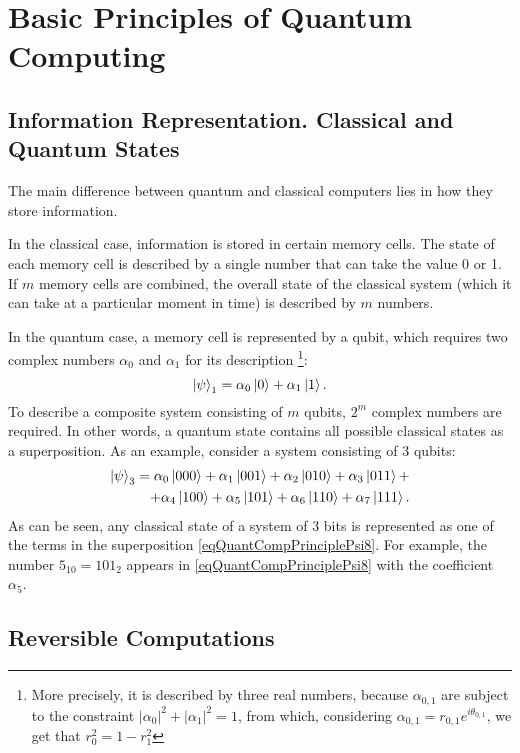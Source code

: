 \section{Basic Principles of Quantum Computing}

\subsection{Information Representation. Classical and Quantum States}
The main difference between quantum and classical computers lies in how they store information.

In the classical case, information is stored in certain memory cells. The state of each memory cell is described by a single number that can take the value 0 or 1. If $m$ memory cells are combined, the overall state of the classical system (which it can take at a particular moment in time) is described by $m$ numbers.

In the quantum case, a memory cell is represented by a qubit, which requires two complex numbers $\alpha_0$ and $\alpha_1$ for its description \footnote{More precisely, it is described by three real numbers, because $\alpha_{0,1}$ are subject to the constraint $\left|\alpha_0\right|^2 + \left|\alpha_1\right|^2 = 1$, from which, considering $\alpha_{0,1} = r_{0,1}e^{i \theta_{0,1}}$, we get that $r_0^2 = 1 - r_1^2$}:
\[
\left|\psi\right>_1 = \alpha_0 \ket{ 0 } + \alpha_1 \ket{ 1 }.
\]
To describe a composite system consisting of $m$ qubits, $2^m$ complex numbers are required. In other words, a quantum state contains all possible classical states as a superposition. As an example, consider a system consisting of 3 qubits:
\begin{eqnarray}
\left|\psi\right>_3 = 
\alpha_0 \ket{ 000 } + 
\alpha_1 \ket{ 001 } + 
\alpha_2 \ket{ 010 } + 
\alpha_3 \ket{ 011 } + 
\nonumber \\
+ 
\alpha_4 \ket{ 100 } + 
\alpha_5 \ket{ 101 } + 
\alpha_6 \ket{ 110 } + 
\alpha_7 \ket{ 111 }.
\label{eqQuantCompPrinciplePsi8}
\end{eqnarray}
As can be seen, any classical state of a system of 3 bits is represented as one of the terms in the superposition \eqref{eqQuantCompPrinciplePsi8}. For example, the number $5_{10}=101_2$ appears in \eqref{eqQuantCompPrinciplePsi8} with the coefficient $\alpha_5$.

\subsection{Reversible Computations}

